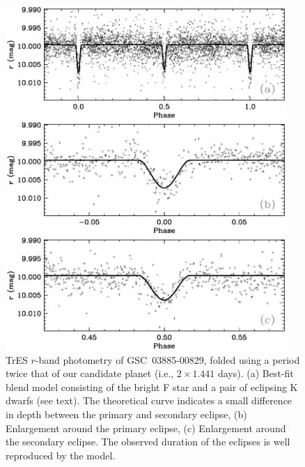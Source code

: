 \begin{figure}
\begin{center}
\includegraphics[width=0.95\textwidth]{3_f6}
\caption[$r$-band photometry modeled as an F/K+K blend]{TrES $r$-band photometry of \mbox{GSC 03885-00829}, folded
  using a period twice that of our candidate planet (i.e., $2 \times
  1.441$ days). (a) Best-fit blend model consisting of the bright F
  star and a pair of eclipsing K dwarfs (see text). The theoretical
  curve indicates a small difference in depth between the primary and
  secondary eclipse, (b) Enlargement around the primary eclipse, (c)
  Enlargement around the secondary eclipse. The observed duration of
  the eclipses is well reproduced by the model.}
\label{cha:gsc:fig:MMmodel}
\end{center}
\end{figure}

